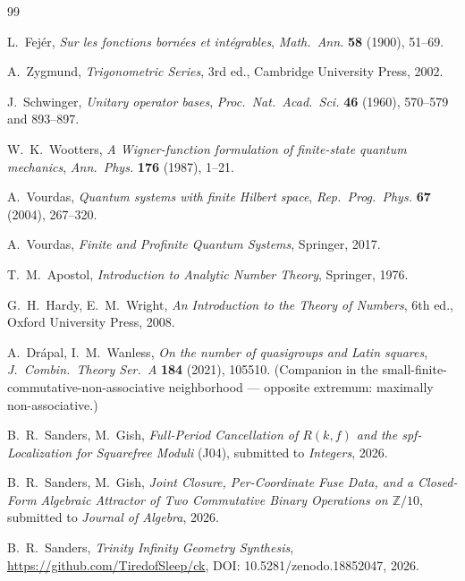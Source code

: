\documentclass[11pt,reqno]{amsart}
\theoremstyle{plain}
\theoremstyle{definition}
\theoremstyle{remark}
\newcommand{\Z}{\mathbb{Z}}
\begin{document}
\begin{thebibliography}{99}

L.~Fej\'er,
\emph{Sur les fonctions born\'ees et int\'egrables},
\textit{Math.\ Ann.} \textbf{58} (1900), 51--69.

A.~Zygmund,
\emph{Trigonometric Series}, 3rd ed.,
Cambridge University Press, 2002.

J.~Schwinger,
\emph{Unitary operator bases},
\textit{Proc.\ Nat.\ Acad.\ Sci.} \textbf{46} (1960), 570--579 and 893--897.

W.~K.~Wootters,
\emph{A Wigner-function formulation of finite-state quantum mechanics},
\textit{Ann.\ Phys.} \textbf{176} (1987), 1--21.

A.~Vourdas,
\emph{Quantum systems with finite Hilbert space},
\textit{Rep.\ Prog.\ Phys.} \textbf{67} (2004), 267--320.

A.~Vourdas,
\emph{Finite and Profinite Quantum Systems},
Springer, 2017.

T.~M.~Apostol,
\emph{Introduction to Analytic Number Theory},
Springer, 1976.

G.~H.~Hardy, E.~M.~Wright,
\emph{An Introduction to the Theory of Numbers}, 6th ed.,
Oxford University Press, 2008.

A.~Dr\'apal, I.~M.~Wanless,
\emph{On the number of quasigroups and Latin squares},
\textit{J.\ Combin.\ Theory Ser.\ A} \textbf{184} (2021), 105510.
(Companion in the small-finite-commutative-non-associative neighborhood --- opposite
extremum: maximally non-associative.)

B.~R.~Sanders, M.~Gish,
\emph{Full-Period Cancellation of $R(k,f)$ and the spf-Localization for Squarefree
Moduli} (J04),
submitted to \textit{Integers}, 2026.

B.~R.~Sanders, M.~Gish,
\emph{Joint Closure, Per-Coordinate Fuse Data, and a Closed-Form Algebraic Attractor of
Two Commutative Binary Operations on $\Z/10$},
submitted to \textit{Journal of Algebra}, 2026.

B.~R.~Sanders,
\emph{Trinity Infinity Geometry Synthesis},
\url{https://github.com/TiredofSleep/ck},
DOI: 10.5281/zenodo.18852047, 2026.

\end{thebibliography}
\end{document}
